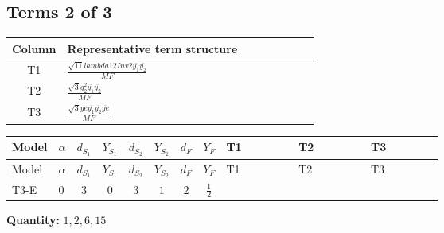 \documentclass[8pt]{article}
\begin{document}
\begin{landscape}
\subsection*{Terms 2 of 3}
\begin{center}
\begin{tabular}{@{}c >{\raggedright\arraybackslash}p{0.82\linewidth}@{}}
\toprule
Column & Representative term structure \\
\midrule
T1 & \(\displaystyle \frac{\sqrt{11} lambda12Inv2 \overline{y_{1}} \overline{y_{2}}}{MF}\) \\
\midrule
T2 & \(\displaystyle \frac{\sqrt{3} g_{2}^{2} \overline{y_{1}} \overline{y_{2}}}{MF}\) \\
\midrule
T3 & \(\displaystyle \frac{\sqrt{3} ye \overline{y_{1}} \overline{y_{2}} \overline{ye}}{MF}\) \\
\midrule
\bottomrule
\end{tabular}
\end{center}
\smallskip
\tiny
\begin{longtable}{@{}llcccccc >{\raggedright\arraybackslash}p{0.21\linewidth} >{\raggedright\arraybackslash}p{0.21\linewidth} >{\raggedright\arraybackslash}p{0.21\linewidth}@{}}
\toprule
Model & $\alpha$ & $d_{S_1}$ & $Y_{S_1}$ & $d_{S_2}$ & $Y_{S_2}$ & $d_F$ & $Y_F$ & T1 & T2 & T3 \\
\midrule
\endfirsthead
\toprule
Model & $\alpha$ & $d_{S_1}$ & $Y_{S_1}$ & $d_{S_2}$ & $Y_{S_2}$ & $d_F$ & $Y_F$ & T1 & T2 & T3 \\
\midrule
\endhead
T3-E & $0$ & $3$ & $0$ & $3$ & $1$ & $2$ & $\frac{1}{2}$ & \scriptsize\adjustbox{max width=\linewidth}{$\begin{gathered} \frac{3 \sqrt{11} lambda12Inv2 \overline{y_{1}} \overline{y_{2}}}{22 MF}\end{gathered}$} & \scriptsize\adjustbox{max width=\linewidth}{$\begin{gathered} \frac{15 \sqrt{3} g_{2}^{2} \overline{y_{1}} \overline{y_{2}}}{8 MF}\end{gathered}$} & \scriptsize\adjustbox{max width=\linewidth}{$\begin{gathered} - \frac{\sqrt{3} ye \overline{y_{1}} \overline{y_{2}} \overline{ye}}{12 MF}\end{gathered}$} \\
\midrule
\bottomrule
\end{longtable}
\clearpage
\noindent\textbf{Quantity: }$\mathrm{1,2,6,15}$\par\smallskip

\end{landscape}
\end{document}

